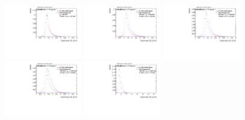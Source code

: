 \begin{figure}
\bigskip
\includegraphics[width=0.3\textwidth]{sascha_input/Appendix/Distributions/higgs/distributions/beta05/h_recoJet_D2_05_bin1.pdf} \hspace{1mm}
\includegraphics[width=0.3\textwidth]{sascha_input/Appendix/Distributions/higgs/distributions/beta05/h_recoJet_D2_05_bin2.pdf} \hspace{4mm}
\includegraphics[width=0.3\textwidth]{sascha_input/Appendix/Distributions/higgs/distributions/beta05/h_recoJet_D2_05_bin3.pdf} 
\bigskip
\includegraphics[width=0.3\textwidth]{sascha_input/Appendix/Distributions/higgs/distributions/beta05/h_recoJet_D2_05_bin4.pdf} \hspace{4mm}
\includegraphics[width=0.3\textwidth]{sascha_input/Appendix/Distributions/higgs/distributions/beta05/h_recoJet_D2_05_bin5.pdf} 


\end{figure}
